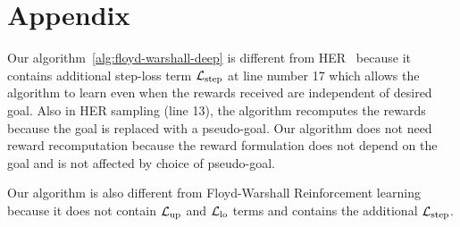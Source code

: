 \section{Appendix}

Our algorithm~\ref{alg:floyd-warshall-deep} is different from
HER~\cite{andrychowicz2016learning} because it contains additional step-loss
term $\mathcal{L}_{\text{step}}$ at line number 17 which allows the algorithm to learn even when
the rewards received are independent of desired goal. Also in HER sampling (line
13), the algorithm recomputes the rewards because the goal is replaced with a
pseudo-goal. Our algorithm does not need reward recomputation because the reward
formulation does not depend on the goal and is not affected by choice of
pseudo-goal.

Our algorithm is also different from Floyd-Warshall Reinforcement learning
because it does not contain $\mathcal{L}_{\text{up}}$ and $\mathcal{L}_{\text{lo}}$ terms and contains the
additional $\mathcal{L}_{\text{step}}$.


